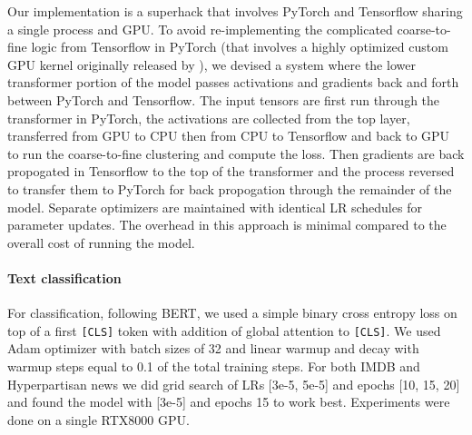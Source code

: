 \documentclass[11pt,a4paper]{article}
\begin{document}
Our implementation is a superhack that involves PyTorch and Tensorflow sharing a single process and GPU.  To avoid re-implementing the complicated coarse-to-fine logic from Tensorflow in PyTorch (that involves a highly optimized custom GPU kernel originally released by \citet{lee-etal-2018-higher}), we devised a system where the lower transformer portion of the model passes activations and gradients back and forth between PyTorch and Tensorflow.  The input tensors are first run through the transformer in PyTorch, the activations are collected from the top layer, transferred from GPU to CPU then from CPU to Tensorflow and back to GPU to run the coarse-to-fine clustering and compute the loss.  Then gradients are back propogated in Tensorflow to the top of the transformer and the process reversed to transfer them to PyTorch for back propogation through the remainder of the model.  Separate optimizers are maintained with identical LR schedules for parameter updates.  The overhead in this approach is minimal compared to the overall cost of running the model.


\paragraph{Text classification}
For classification, following BERT, we used a simple binary cross entropy loss on top of a first \texttt{[CLS]} token with addition of global attention to \texttt{[CLS]}. We used Adam optimizer with batch sizes of 32 and linear warmup and decay with warmup steps equal to 0.1 of the total training steps. For both IMDB and Hyperpartisan news we did grid search of LRs [3e-5, 5e-5] and epochs [10, 15, 20] and found the model with [3e-5] and epochs 15 to work best. Experiments were done on a single RTX8000 GPU. 







%
 
\end{document}
